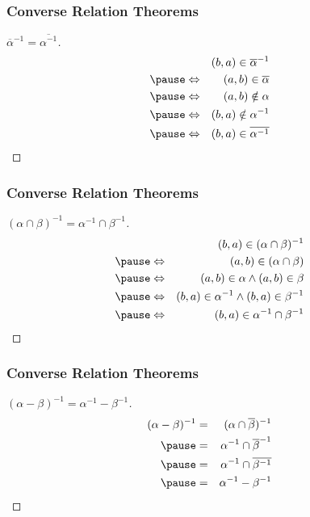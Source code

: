 \documentclass[dvipsnames]{beamer}
\begin{document}
\begin{frame}
  \frametitle{Converse Relation Theorems}

  \begin{proof}[$\overline{\alpha}^{-1} = \overline{\alpha^{-1}}$]
    \pause
    \begin{eqnarray*}
      &                 & (b,a) \in \overline{\alpha}^{-1}\\\pause
      & \Leftrightarrow & (a,b) \in \overline{\alpha}\\\pause
      & \Leftrightarrow & (a,b) \notin \alpha\\\pause
      & \Leftrightarrow & (b,a) \notin \alpha^{-1}\\\pause
      & \Leftrightarrow & (b,a) \in \overline{\alpha^{-1}}
    \end{eqnarray*}
  \end{proof}
\end{frame}

\begin{frame}
  \frametitle{Converse Relation Theorems}

  \begin{proof}[$(\alpha \cap \beta)^{-1} = \alpha^{-1} \cap \beta^{-1}$]
    \pause
    \begin{eqnarray*}
      &                 & (b,a) \in (\alpha \cap \beta)^{-1}\\\pause
      & \Leftrightarrow & (a,b) \in (\alpha \cap \beta)\\\pause
      & \Leftrightarrow & (a,b) \in \alpha \wedge (a,b) \in \beta\\\pause
      & \Leftrightarrow & (b,a) \in \alpha^{-1}
                   \wedge (b,a) \in \beta^{-1}\\\pause
      & \Leftrightarrow & (b,a) \in \alpha^{-1} \cap \beta^{-1}
    \end{eqnarray*}
  \end{proof}
\end{frame}

\begin{frame}
  \frametitle{Converse Relation Theorems}

  \begin{proof}[$(\alpha - \beta)^{-1} = \alpha^{-1} - \beta^{-1}$]
    \pause
    \begin{eqnarray*}
      (\alpha - \beta)^{-1} & = & (\alpha \cap \overline{\beta})^{-1}\\\pause
                            & = & \alpha^{-1} \cap \overline{\beta}^{-1}\\\pause
                            & = & \alpha^{-1} \cap \overline{\beta^{-1}}\\\pause
                            & = & \alpha^{-1} - \beta^{-1}
    \end{eqnarray*}
  \end{proof}
\end{frame}
\end{document}
